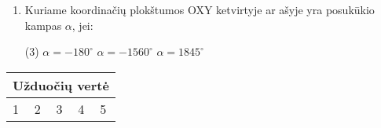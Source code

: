 \documentclass[a4paper]{article}
\begin{document}
\begin{enumerate}
      \item Kuriame koordinačių plokštumos OXY ketvirtyje ar ašyje yra
            posukūkio kampas $\alpha$, jei:

            \begin{tasks}[item-format={\normalfont},
                        after-item-skip=4mm](3)
                  \task $\alpha = -180^\circ$
                  \task $\alpha = -1560^\circ$
                  \task $\alpha = 1845^\circ$
            \end{tasks}

\end{enumerate}

\begin{table}[!htpb]
      \centering
      \begin{tabular}{|lllllllllllllll|}
            \hline
            \multicolumn{15}{|l|}{Užduočių vertė}

            \\ \hline
            \multicolumn{3}{|l|}{1}

             & \multicolumn{2}{l|}{2}

             & \multicolumn{4}{l|}{3}

             &
            \multicolumn{3}{l|}{4}

             & \multicolumn{3}{l|}{5}


\end{tabular}
\end{table}
\end{document}
